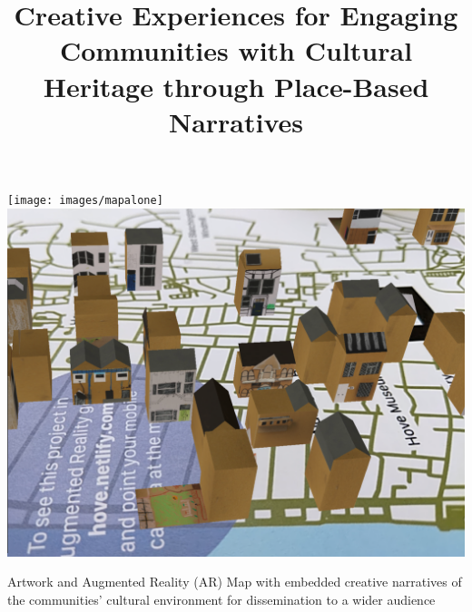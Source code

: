 \documentclass[acmlarge,screen,dvipsnames]{acmart}
\begin{document}
%


\title[Creative Experiences for engaging communities with cultural heritage]%
      {Creative Experiences for Engaging Communities with Cultural Heritage through Place-Based Narratives}
%



%
\renewcommand{\shortauthors}{K. Rodriguez, et al.}

%
\begin{teaserfigure}
\centering
 \texttt{[image: images/mapalone]}
 \includegraphics[width=.40\linewidth]{images/screenshoot}
  \caption{Artwork and Augmented Reality (AR) Map
with embedded creative narratives of the communities' cultural environment 
for dissemination to a wider audience\vspace*{0.5\baselineskip}}
  \label{fig:teaser}
\end{teaserfigure}
\end{document}
